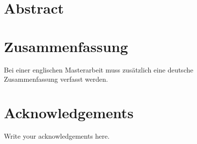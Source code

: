 \documentclass[a4paper,UKenglish,compactauthor]{lipics-v2021}
\begin{document}
\setcounter{page}{1}


\section*{Abstract}

\newpage

\section*{Zusammenfassung}

Bei einer englischen Masterarbeit muss zus\"atzlich eine deutsche Zusammenfassung verfasst werden.

\newpage

\section*{Acknowledgements}

Write your acknowledgements here.

\cleardoublepage



\small\normalsize
{} %
\tableofcontents
{}


\small\normalsize

\cleardoublepage


\end{document}
